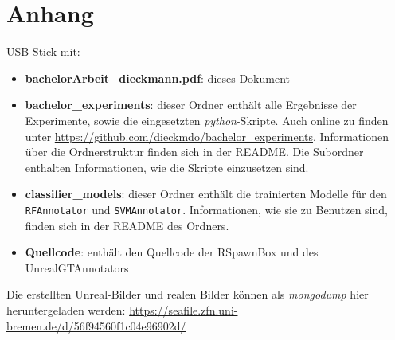 \appendix
\chapter{Anhang}

USB-Stick mit:
\begin{itemize}
	\item \textbf{bachelorArbeit\_dieckmann.pdf}: dieses Dokument
	\item \textbf{bachelor\_experiments}: dieser Ordner enthält alle Ergebnisse der Experimente, sowie die eingesetzten \textit{python}-Skripte. Auch online zu finden unter \url{https://github.com/dieckmdo/bachelor\_experiments}. Informationen über die Ordnerstruktur finden sich in der README. Die Subordner enthalten Informationen, wie die Skripte einzusetzen sind.
	\item \textbf{classifier\_models}: dieser Ordner enthält die trainierten Modelle für den \texttt{RFAnnotator} und \texttt{SVMAnnotator}. Informationen, wie sie zu Benutzen sind, finden sich in der README des Ordners.
	\item \textbf{Quellcode}: enthält den Quellcode der RSpawnBox und des UnrealGTAnnotators
\end{itemize}








Die erstellten Unreal-Bilder und realen Bilder können als \textit{mongodump} hier heruntergeladen werden: \newline 
\url{https://seafile.zfn.uni-bremen.de/d/56f94560f1c04e96902d/}